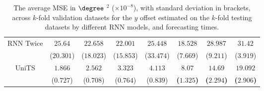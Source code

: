 \begin{table}[!ht]
{\begin{tabular}{|c|c|c|c|c|c|c|c|}
			\multirow{2}{*}{RNN Twice} & $25.64$ & $22.658$ & $22.001$ & $25.448$ & $18.528$ & $28.987$ & $31.42$ \\
			 & ($20.301$) & ($18.023$) & ($15.853$) & ($33.474$) & ($7.669$) & ($9.211$) & ($3.919$) \\ \hline
			\multirow{2}{*}{UniTS} & $1.866$ & $2.562$ & $3.323$ & $4.113$ & $\mathbf{8.07}$ & $\mathbf{14.69}$ & $\mathbf{19.092}$ \\
			 & ($0.727$) & ($0.708$) & ($0.764$) & ($0.839$) & \textbf{(}$\mathbf{1.325}$\textbf{)} & \textbf{(}$\mathbf{2.294}$\textbf{)} & \textbf{(}$\mathbf{2.906}$\textbf{)} \\ \hline
		\end{tabular}
	}
	\caption{The average MSE in $\degree$ $^{2}$ ($\times 10^{-8}$), with standard deviation in brackets, across $k$-fold validation datasets for the $y$ offset estimated on the $k$-fold testing datasets by different RNN models, and forecasting times.}
	\label{tab:all_latitude_no_abs_MSE}
\end{table}